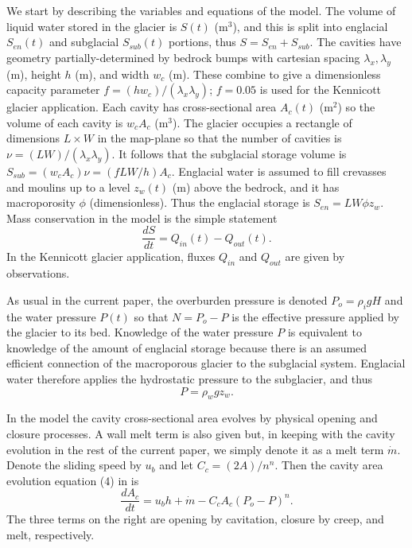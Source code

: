\documentclass[11pt,final]{amsart}%
\begin{document}
We start by describing the variables and equations of the  \cite{Bartholomausetal2011} model.  The volume of liquid water stored in the glacier is $S(t)$ (m$^3$), and this is split into englacial $S_{en}(t)$ and subglacial $S_{sub}(t)$ portions, thus $S=S_{en}+S_{sub}$.  The cavities have geometry partially-determined by bedrock bumps with cartesian spacing $\lambda_x,\lambda_y$ (m), height $h$ (m), and width $w_c$ (m).  These combine to give a dimensionless capacity parameter $f=(h w_c)/(\lambda_x \lambda_y)$; $f=0.05$ is used for the Kennicott glacier application.  Each cavity has cross-sectional area $A_c(t)$ (m$^2$) so the volume of each cavity is $w_c A_c$ (m$^3$).  The glacier occupies a rectangle of dimensions $L\times W$ in the map-plane so that the number of cavities is $\nu = (LW)/(\lambda_x\lambda_y)$.  It follows that the subglacial storage volume is $S_{sub} = (w_c A_c) \nu = (f L W/h) A_c$.  Englacial water is assumed to fill crevasses and moulins up to a level $z_w(t)$ (m) above the bedrock, and it has macroporosity $\phi$ (dimensionless).  Thus the englacial storage is $S_{en}=L W \phi z_w$.  Mass conservation in the model is the simple statement  \citep{Bartholomausetal2008}
\begin{equation}
\frac{dS}{dt} = Q_{in}(t) - Q_{out}(t). \label{eq:barth:massconserve}
\end{equation}
In the Kennicott glacier application, fluxes $Q_{in}$ and $Q_{out}$ are given by observations.

As usual in the current paper, the overburden pressure is denoted $P_o=\rho_i g H$ and the water pressure $P(t)$ so that $N=P_o-P$ is the effective pressure applied by the glacier to its bed.  Knowledge of the water pressure $P$ is equivalent to knowledge of the amount of englacial storage because there is an assumed efficient connection of the macroporous glacier to the subglacial system.  Englacial water therefore applies the hydrostatic pressure to the subglacier, and thus
\begin{equation}
P = \rho_w g z_w.  \label{eq:barth:englacialpressure}
\end{equation}

In the \cite{Bartholomausetal2011} model the cavity cross-sectional area evolves by physical opening and closure processes.  A wall melt term is also given but, in keeping with the cavity evolution in the rest of the current paper, we simply denote it as a melt term $\dot m$.  Denote the sliding speed by $u_b$ and let $C_c = (2 A)/n^n$.  Then the cavity area evolution equation (4) in \cite{Bartholomausetal2011} is
\begin{equation}
\frac{dA_c}{dt} = u_b h + \dot m - C_c A_c (P_o-P)^n.  \label{eq:barth:cavityevolution}
\end{equation}
The three terms on the right are opening by cavitation, closure by creep, and melt, respectively.
\end{document}

